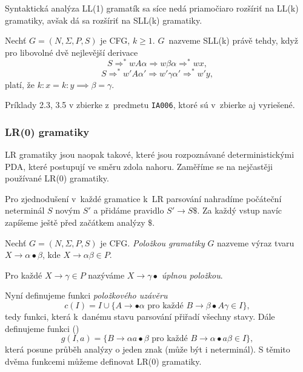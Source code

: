 Syntaktická analýza LL(1) gramatík sa síce nedá priamočiaro
rozšíriť na LL(k) gramatiky, avšak dá sa rozšíriť na SLL(k) gramatiky.

\begin{definition}
    Nechť $G = (N, \Sigma, P, S)$ je CFG, $k \geq 1$. $G$~nazveme SLL(k)
    právě tehdy, když pro libovolné dvě nejlevější derivace
	\[
		S \Rightarrow^* wA\alpha \Rightarrow w\beta\alpha \Rightarrow^* wx,
	\]
    \[ 
		S \Rightarrow^* w'A\alpha' \Rightarrow w'\gamma\alpha' \Rightarrow^* w'y,
	\]
    platí, že $k : x = k : y \implies \beta = \gamma$.
\end{definition}

\begin{example}
	Príklady 2.3, 3.5 v zbierke z~predmetu \verb|IA006|, ktoré sú v~zbierke aj vyriešené.
\end{example}

\subsubsection{LR(0) gramatiky}


LR gramatiky jsou naopak takové, které jsou rozpoznávané deterministickými PDA,
které postupují ve směru zdola nahoru. Zaměříme se na nejčastěji
používané LR(0) gramatiky.

Pro zjednodušení v~každé gramatice k~LR parsování nahradíme počáteční
neterminál $S$ novým $S'$ a přidáme pravidlo $S' \to S\$$. Za každý
vstup navíc zapíšeme ještě před začátkem analýzy $\$$.

\begin{definition}
    Nechť $G = (N, \Sigma, P, S)$ je CFG.
    {\em Položkou gramatiky} $G$ nazveme výraz tvaru
    $X \to \alpha \bullet \beta$, kde $X \to \alpha \beta \in P$.

    Pro každé $X \to \gamma \in P$ nazýváme $X \to \gamma \bullet$
    {\em úplnou položkou}.
\end{definition}

Nyní definujeme funkci {\em položkového uzávěru}
\[
    c(I) = I \cup
    \{ A \to \bullet \alpha \text{ pro každé } B \to \beta \bullet A \gamma \in I \},
\]
tedy funkci, která k~danému stavu parsování přiřadí všechny
 stavy. Dále definujeme funkci ()
\[
g(I, a) = \{ B \to \alpha a \bullet \beta \text{ pro každé }
    B \to \alpha \bullet a \beta \in I \},
\]
která posune průběh analýzy o jeden znak (může být i neterminál).
S těmito dvěma funkcemi můžeme definovat LR(0) gramatiky.


